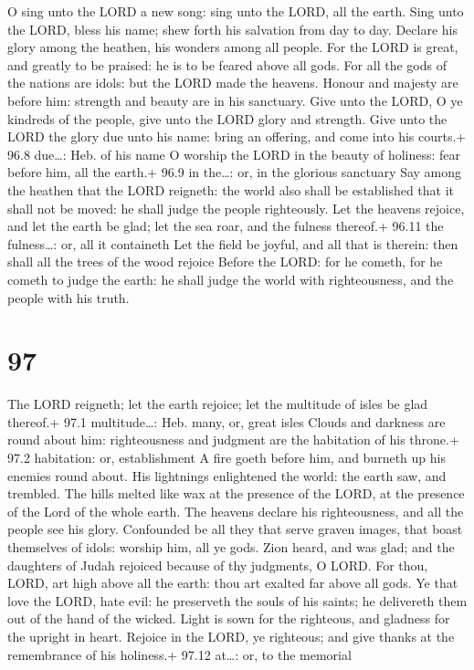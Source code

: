  O sing unto the LORD a new song: sing unto the LORD, all
the earth.  Sing unto the LORD, bless his name; shew forth
his salvation from day to day.  Declare his glory among the
heathen, his wonders among all people.  For the LORD is
great, and greatly to be praised: he is to be feared above all gods.
 For all the gods of the nations are idols: but the LORD
made the heavens.  Honour and majesty are before him:
strength and beauty are in his sanctuary.  Give unto the
LORD, O ye kindreds of the people, give unto the LORD glory and
strength.  Give unto the LORD the glory due unto his name:
bring an offering, and come into his courts.+ 96.8 due\ldots: Heb. of
his name  O worship the LORD in the beauty of holiness: fear
before him, all the earth.+ 96.9 in the\ldots: or, in the glorious
sanctuary  Say among the heathen that the LORD reigneth:
the world also shall be established that it shall not be moved: he shall
judge the people righteously.  Let the heavens rejoice, and
let the earth be glad; let the sea roar, and the fulness thereof.+ 96.11
the fulness\ldots: or, all it containeth  Let the field be
joyful, and all that is therein: then shall all the trees of the wood
rejoice  Before the LORD: for he cometh, for he cometh to
judge the earth: he shall judge the world with righteousness, and the
people with his truth.

\hypertarget{section-96}{%
\section{97}\label{section-96}}

 The LORD reigneth; let the earth rejoice; let the multitude
of isles be glad thereof.+ 97.1 multitude\ldots: Heb. many, or, great
isles  Clouds and darkness are round about him:
righteousness and judgment are the habitation of his throne.+ 97.2
habitation: or, establishment  A fire goeth before him, and
burneth up his enemies round about.  His lightnings
enlightened the world: the earth saw, and trembled.  The
hills melted like wax at the presence of the LORD, at the presence of
the Lord of the whole earth.  The heavens declare his
righteousness, and all the people see his glory.  Confounded
be all they that serve graven images, that boast themselves of idols:
worship him, all ye gods.  Zion heard, and was glad; and the
daughters of Judah rejoiced because of thy judgments, O LORD.
 For thou, LORD, art high above all the earth: thou art
exalted far above all gods.  Ye that love the LORD, hate
evil: he preserveth the souls of his saints; he delivereth them out of
the hand of the wicked.  Light is sown for the righteous,
and gladness for the upright in heart.  Rejoice in the
LORD, ye righteous; and give thanks at the remembrance of his holiness.+
97.12 at\ldots: or, to the memorial

